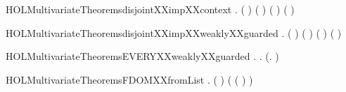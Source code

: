 \newcommand{\HOLMultivariateTheoremsDISJOINTXXBVXXCCSXXSUBST}{\UseVerbatim{HOLMultivariateTheoremsDISJOINTXXBVXXCCSXXSUBST}}
\begin{SaveVerbatim}{HOLMultivariateTheoremsdisjointXXimpXXcontext}
\HOLTokenTurnstile{} \HOLSymConst{\HOLTokenForall{}} .
        ( ) ( ) \HOLSymConst{\HOLTokenConj{}}  ( ) ( ) \HOLSymConst{\HOLTokenImp{}}
         
\end{SaveVerbatim}
\newcommand{\HOLMultivariateTheoremsdisjointXXimpXXcontext}{\UseVerbatim{HOLMultivariateTheoremsdisjointXXimpXXcontext}}
\begin{SaveVerbatim}{HOLMultivariateTheoremsdisjointXXimpXXweaklyXXguarded}
\HOLTokenTurnstile{} \HOLSymConst{\HOLTokenForall{}} .
        ( ) ( ) \HOLSymConst{\HOLTokenConj{}}  ( ) ( ) \HOLSymConst{\HOLTokenImp{}}
         
\end{SaveVerbatim}
\newcommand{\HOLMultivariateTheoremsdisjointXXimpXXweaklyXXguarded}{\UseVerbatim{HOLMultivariateTheoremsdisjointXXimpXXweaklyXXguarded}}
\begin{SaveVerbatim}{HOLMultivariateTheoremsEVERYXXweaklyXXguarded}
\HOLTokenTurnstile{} \HOLSymConst{\HOLTokenForall{}} .
          \HOLSymConst{\HOLTokenImp{}}
       \HOLSymConst{\HOLTokenForall{}} .    \HOLSymConst{\HOLTokenConj{}}    \HOLSymConst{\HOLTokenImp{}}  (\HOLTokenLambda{}.    )
\end{SaveVerbatim}
\newcommand{\HOLMultivariateTheoremsEVERYXXweaklyXXguarded}{\UseVerbatim{HOLMultivariateTheoremsEVERYXXweaklyXXguarded}}
\begin{SaveVerbatim}{HOLMultivariateTheoremsFDOMXXfromList}
\HOLTokenTurnstile{} \HOLSymConst{\HOLTokenForall{}} . (  \HOLSymConst{=}  ) \HOLSymConst{\HOLTokenImp{}} ( ( \HOLSymConst{\HOLTokenMapto{}} ) \HOLSymConst{=}  )
\end{SaveVerbatim}
